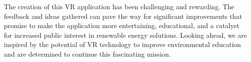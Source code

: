 \documentclass[draft, final]{vutinfth} %
\begin{document}
The creation of this VR application has been challenging and rewarding. The feedback and ideas gathered can pave the way for significant improvements that promise to make the application more entertaining, educational, and a catalyst for increased public interest in renewable energy solutions. Looking ahead, we are inspired by the potential of VR technology to improve environmental education and are determined to continue this fascinating mission.

\backmatter

\listoffigures %



\printindex

\printglossaries


% 

\end{document}
